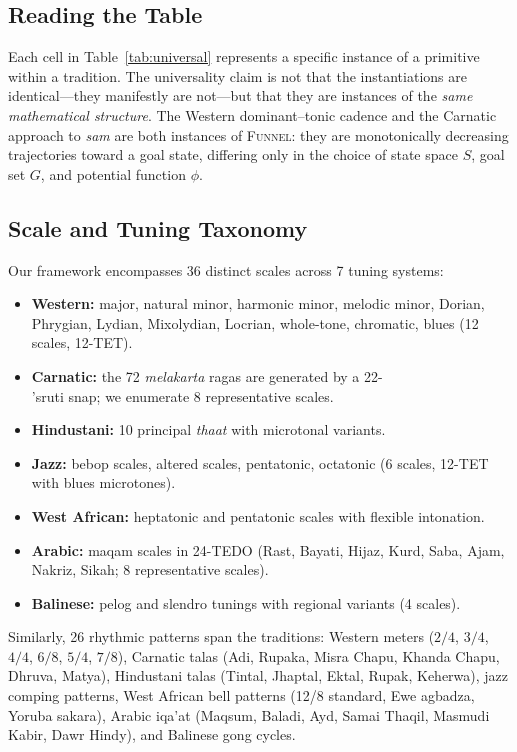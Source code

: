 \documentclass[cmj]{article}
\newcommand{\FUNNEL}{\textsc{Funnel}}
\begin{document}
\subsection{Reading the Table}

Each cell in Table~\ref{tab:universal} represents a specific instance of a
primitive within a tradition. The universality claim is not that the
instantiations are identical---they manifestly are not---but that they are
instances of the \emph{same mathematical structure}. The Western dominant--tonic
cadence and the Carnatic approach to \emph{sam} are both instances of
\FUNNEL{}: they are monotonically decreasing trajectories toward a goal state,
differing only in the choice of state space $S$, goal set $G$, and potential
function $\phi$.

\subsection{Scale and Tuning Taxonomy}

Our framework encompasses 36 distinct scales across 7 tuning systems:

\begin{itemize}[nosep]
  \item \textbf{Western:} major, natural minor, harmonic minor, melodic
    minor, Dorian, Phrygian, Lydian, Mixolydian, Locrian, whole-tone,
    chromatic, blues (12 scales, 12-TET).
  \item \textbf{Carnatic:} the 72 \emph{melakarta} ragas are generated by a
    22-\\'{s}ruti snap; we enumerate 8 representative scales.
  \item \textbf{Hindustani:} 10 principal \emph{thaat} with microtonal
    variants.
  \item \textbf{Jazz:} bebop scales, altered scales, pentatonic, octatonic
    (6 scales, 12-TET with blues microtones).
  \item \textbf{West African:} heptatonic and pentatonic scales with flexible
    intonation.
  \item \textbf{Arabic:} maqam scales in 24-TEDO (Rast, Bayati, Hijaz,
    Kurd, Saba, Ajam, Nakriz, Sikah; 8 representative scales).
  \item \textbf{Balinese:} pelog and slendro tunings with regional variants
    (4 scales).
\end{itemize}

Similarly, 26 rhythmic patterns span the traditions: Western meters ($2/4$,
$3/4$, $4/4$, $6/8$, $5/4$, $7/8$), Carnatic talas (Adi, Rupaka,
Misra Chapu, Khanda Chapu, Dhruva, Matya), Hindustani talas (Tintal, Jhaptal,
Ektal, Rupak, Keherwa), jazz comping patterns, West African bell patterns
(12/8 standard, Ewe agbadza, Yoruba sakara), Arabic iqa'at (Maqsum, Baladi,
Ayd, Samai Thaqil, Masmudi Kabir, Dawr Hindy), and Balinese gong cycles.
\end{document}
